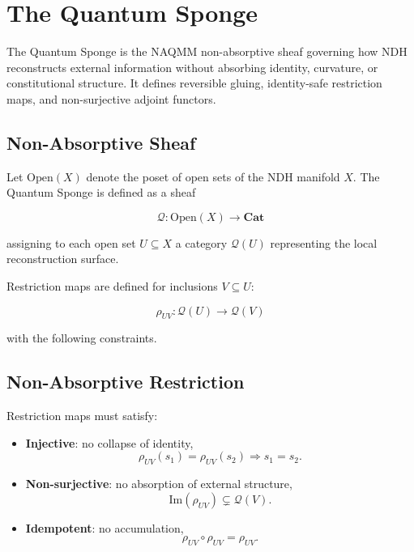 
\section{The Quantum Sponge}
\label{sec:quantum-sponge}

The Quantum Sponge is the NAQMM non-absorptive sheaf governing how NDH
reconstructs external information without absorbing identity, curvature,
or constitutional structure. It defines reversible gluing, identity-safe
restriction maps, and non-surjective adjoint functors.


\subsection{Non-Absorptive Sheaf}

Let $\mathrm{Open}(X)$ denote the poset of open sets of the NDH manifold
$X$. The Quantum Sponge is defined as a sheaf

\[
\mathcal{Q} : \mathrm{Open}(X) \to \mathbf{Cat}
\]

assigning to each open set $U \subseteq X$ a category $\mathcal{Q}(U)$
representing the local reconstruction surface.

Restriction maps are defined for inclusions $V \subseteq U$:

\[
\rho_{UV} : \mathcal{Q}(U) \to \mathcal{Q}(V)
\]

with the following constraints.


\subsection{Non-Absorptive Restriction}

Restriction maps must satisfy:

\begin{itemize}
    \item \textbf{Injective}: no collapse of identity,
    \[
    \rho_{UV}(s_1) = \rho_{UV}(s_2) \Rightarrow s_1 = s_2.
    \]

    \item \textbf{Non-surjective}: no absorption of external structure,
    \[
    \mathrm{Im}(\rho_{UV}) \subsetneq \mathcal{Q}(V).
    \]

    \item \textbf{Idempotent}: no accumulation,
    \[
    \rho_{UV} \circ \rho_{UV} = \rho_{UV}.
    \]
\end{itemize}

